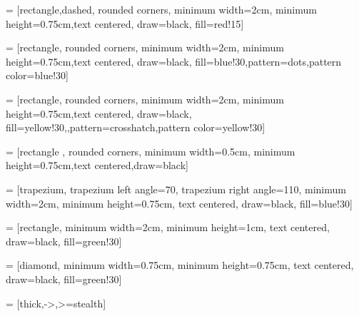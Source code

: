 \usetikzlibrary{patterns,positioning}
 = [rectangle,dashed, rounded corners, minimum width=2cm, minimum height=0.75cm,text centered, draw=black, fill=red!15]

 = [rectangle, rounded corners, minimum width=2cm, minimum height=0.75cm,text centered, draw=black, fill=blue!30,pattern=dots,pattern color=blue!30]

 = [rectangle, rounded corners, minimum width=2cm, minimum height=0.75cm,text centered, draw=black, fill=yellow!30,,pattern=crosshatch,pattern color=yellow!30]

 = [rectangle , rounded corners, minimum width=0.5cm, minimum height=0.75cm,text centered,draw=black]


 = [trapezium, trapezium left angle=70, trapezium right angle=110, minimum width=2cm, minimum height=0.75cm, text centered, draw=black, fill=blue!30]



 = [rectangle, minimum width=2cm, minimum height=1cm, text centered, draw=black, fill=green!30]

 = [diamond, minimum width=0.75cm, minimum height=0.75cm, text centered, draw=black, fill=green!30]

 = [thick,->,>=stealth]